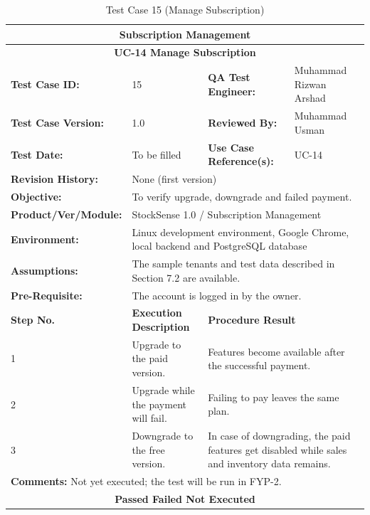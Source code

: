 \documentclass{StockSense}
\begin{document}
\begin{table}[!htbp]
\centering
\caption{Test Case 15 (Manage Subscription)}
{\small\linespread{1}\selectfont\renewcommand{\arraystretch}{1.25}
\begin{tabular}{|p{}|p{}|p{}|p{}|}
\hline
\multicolumn{4}{|c|}{\textbf{Subscription Management}} \\ \hline
\multicolumn{4}{|c|}{\textbf{UC-14 Manage Subscription}} \\ \hline
\textbf{Test Case ID:} & 15 & \textbf{QA Test Engineer:} & Muhammad Rizwan Arshad \\ \hline
\textbf{Test Case Version:} & 1.0 & \textbf{Reviewed By:} & Muhammad Usman \\ \hline
\textbf{Test Date:} & To be filled & \textbf{Use Case Reference(s):} & UC-14 \\ \hline
\textbf{Revision History:} & \multicolumn{3}{p{\dimexpr0.70\textwidth+4\tabcolsep\relax}|}{None (first version)} \\ \hline
\textbf{Objective:} & \multicolumn{3}{p{\dimexpr0.70\textwidth+4\tabcolsep\relax}|}{To verify upgrade, downgrade and failed payment.} \\ \hline
\textbf{Product/Ver/Module:} & \multicolumn{3}{p{\dimexpr0.70\textwidth+4\tabcolsep\relax}|}{StockSense 1.0 / Subscription Management} \\ \hline
\textbf{Environment:} & \multicolumn{3}{p{\dimexpr0.70\textwidth+4\tabcolsep\relax}|}{Linux development environment, Google Chrome, local backend and PostgreSQL database} \\ \hline
\textbf{Assumptions:} & \multicolumn{3}{p{\dimexpr0.70\textwidth+4\tabcolsep\relax}|}{The sample tenants and test data described in Section 7.2 are available.} \\ \hline
\textbf{Pre-Requisite:} & \multicolumn{3}{p{\dimexpr0.70\textwidth+4\tabcolsep\relax}|}{The account is logged in by the owner.} \\ \hline
\textbf{Step No.} & \textbf{Execution Description} & \multicolumn{2}{l|}{\textbf{Procedure Result}} \\ \hline
1 & Upgrade to the paid version. & \multicolumn{2}{p{\dimexpr0.42\textwidth+2\tabcolsep\relax}|}{Features become available after the successful payment.} \\ \hline
2 & Upgrade while the payment will fail. & \multicolumn{2}{p{\dimexpr0.42\textwidth+2\tabcolsep\relax}|}{Failing to pay leaves the same plan.} \\ \hline
3 & Downgrade to the free version. & \multicolumn{2}{p{\dimexpr0.42\textwidth+2\tabcolsep\relax}|}{In case of downgrading, the paid features get disabled while sales and inventory data remains.} \\ \hline
\multicolumn{4}{|l|}{\textbf{Comments:} Not yet executed; the test will be run in FYP-2.} \\ \hline
\multicolumn{4}{|c|}{\textbf{Passed \quad Failed \quad Not Executed}} \\ \hline
\end{tabular}\par}
\end{table}
\end{document}
